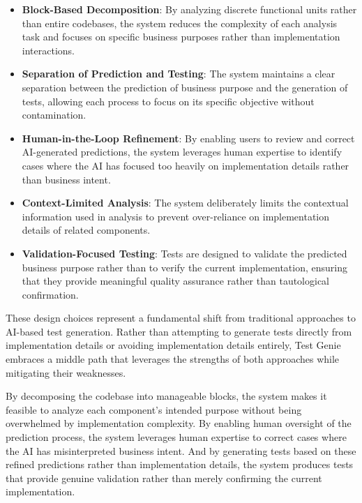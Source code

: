 \begin{itemize}
    \item \textbf{Block-Based Decomposition}: By analyzing discrete functional units rather than entire codebases, the system reduces the complexity of each analysis task and focuses on specific business purposes rather than implementation interactions.
    
    \item \textbf{Separation of Prediction and Testing}: The system maintains a clear separation between the prediction of business purpose and the generation of tests, allowing each process to focus on its specific objective without contamination.
    
    \item \textbf{Human-in-the-Loop Refinement}: By enabling users to review and correct AI-generated predictions, the system leverages human expertise to identify cases where the AI has focused too heavily on implementation details rather than business intent.
    
    \item \textbf{Context-Limited Analysis}: The system deliberately limits the contextual information used in analysis to prevent over-reliance on implementation details of related components.
    
    \item \textbf{Validation-Focused Testing}: Tests are designed to validate the predicted business purpose rather than to verify the current implementation, ensuring that they provide meaningful quality assurance rather than tautological confirmation.
\end{itemize}

\hspace{0.5cm}These design choices represent a fundamental shift from traditional approaches to AI-based test generation. Rather than attempting to generate tests directly from implementation details or avoiding implementation details entirely, Test Genie embraces a middle path that leverages the strengths of both approaches while mitigating their weaknesses.

\hspace{0.5cm}By decomposing the codebase into manageable blocks, the system makes it feasible to analyze each component's intended purpose without being overwhelmed by implementation complexity. By enabling human oversight of the prediction process, the system leverages human expertise to correct cases where the AI has misinterpreted business intent. And by generating tests based on these refined predictions rather than implementation details, the system produces tests that provide genuine validation rather than merely confirming the current implementation.

